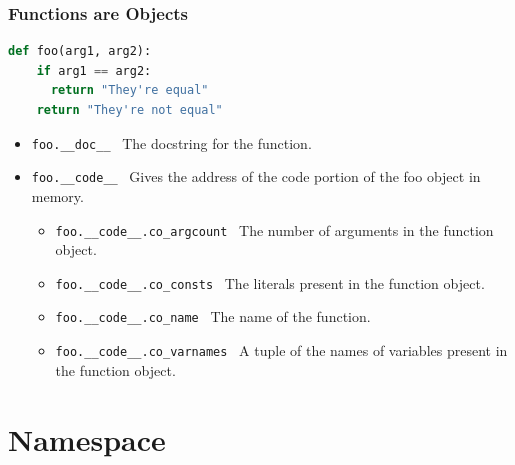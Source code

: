 \documentclass{beamer}
\begin{document}
%
%
\begin{frame}[fragile]
  \frametitle{Functions are Objects}

  \begin{lstlisting}[language=Python, autogobble]
  def foo(arg1, arg2):
    if arg1 == arg2:
      return "They're equal"
    return "They're not equal"
  \end{lstlisting}
  \vfill
  \begin{itemize}
    \item \lstinline|foo.__doc__| \textrightarrow \ The docstring for the function.
    \item \lstinline|foo.__code__| \textrightarrow \ Gives the address of the code portion of the foo object in memory.
      \begin{itemize}
        \item \lstinline|foo.__code__.co_argcount| \textrightarrow \ The number of arguments in the function object.
        \item \lstinline|foo.__code__.co_consts| \textrightarrow \ The literals present in the function object.
        \item \lstinline|foo.__code__.co_name| \textrightarrow \ The name of the function.
        \item \lstinline|foo.__code__.co_varnames| \textrightarrow \ A tuple of the names of variables present in the function object.
      \end{itemize}
  \end{itemize}
\end{frame}

\section{Namespace}
\end{document}
